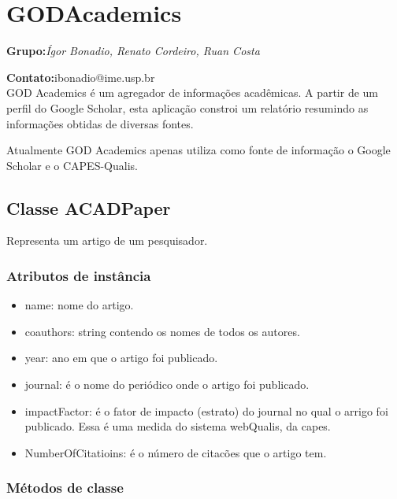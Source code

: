 \section{GODAcademics}

\textbf{Grupo:}\textit{Ígor Bonadio, Renato Cordeiro, Ruan Costa}

\textbf{Contato:}ibonadio@ime.usp.br\\

GOD Academics é um agregador de informações acadêmicas. A partir de um perfil do Google Scholar, esta aplicação constroi um relatório resumindo as informações obtidas de diversas fontes.

Atualmente GOD Academics apenas utiliza como fonte de informação o Google Scholar e o CAPES-Qualis.

\subsection{Classe ACADPaper}

Representa um artigo de um pesquisador.

\subsubsection{Atributos de instância}

\begin{itemize}
  \item name: nome do artigo.

  \item coauthors: string contendo os nomes de todos os autores.

  \item year: ano em que o artigo foi publicado.

  \item journal: é o nome do periódico onde o artigo foi publicado.

  \item impactFactor: é o fator de impacto (estrato) do journal no qual o arrigo foi publicado. Essa é uma    medida do sistema webQualis, da capes.

  \item NumberOfCitatioins: é o número de citacões que o artigo tem.
\end{itemize}

\subsubsection{Métodos de classe}

